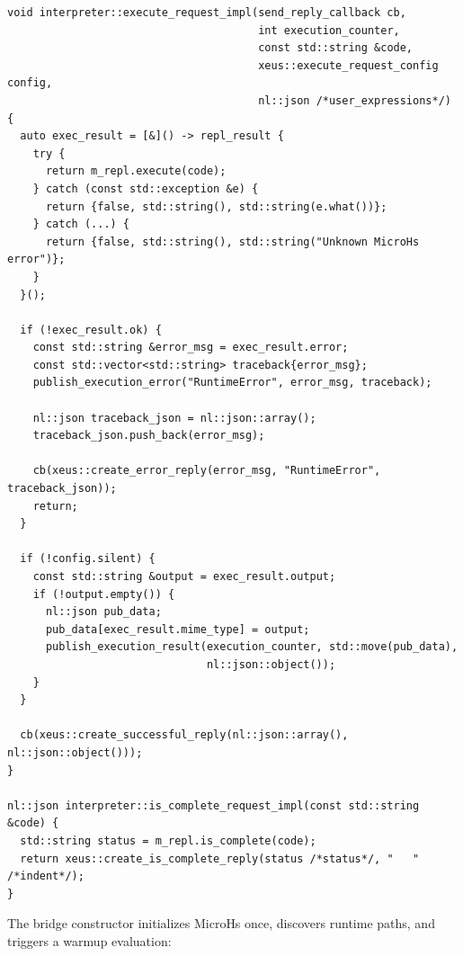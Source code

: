 \begin{verbatim}
void interpreter::execute_request_impl(send_reply_callback cb,
                                       int execution_counter,
                                       const std::string &code,
                                       xeus::execute_request_config config,
                                       nl::json /*user_expressions*/) {
  auto exec_result = [&]() -> repl_result {
    try {
      return m_repl.execute(code);
    } catch (const std::exception &e) {
      return {false, std::string(), std::string(e.what())};
    } catch (...) {
      return {false, std::string(), std::string("Unknown MicroHs error")};
    }
  }();

  if (!exec_result.ok) {
    const std::string &error_msg = exec_result.error;
    const std::vector<std::string> traceback{error_msg};
    publish_execution_error("RuntimeError", error_msg, traceback);

    nl::json traceback_json = nl::json::array();
    traceback_json.push_back(error_msg);

    cb(xeus::create_error_reply(error_msg, "RuntimeError", traceback_json));
    return;
  }

  if (!config.silent) {
    const std::string &output = exec_result.output;
    if (!output.empty()) {
      nl::json pub_data;
      pub_data[exec_result.mime_type] = output;
      publish_execution_result(execution_counter, std::move(pub_data),
                               nl::json::object());
    }
  }

  cb(xeus::create_successful_reply(nl::json::array(), nl::json::object()));
}

nl::json interpreter::is_complete_request_impl(const std::string &code) {
  std::string status = m_repl.is_complete(code);
  return xeus::create_is_complete_reply(status /*status*/, "   " /*indent*/);
}
\end{verbatim}

The bridge constructor initializes MicroHs once, discovers runtime paths, and triggers a warmup evaluation:

